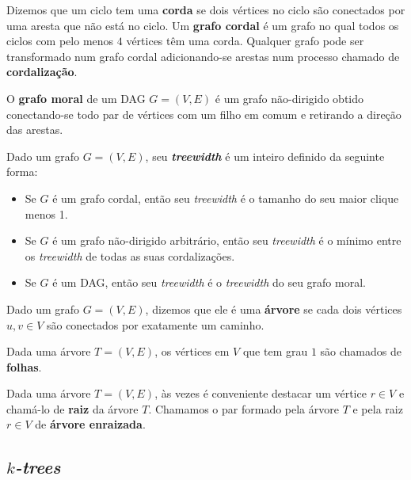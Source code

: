 Dizemos que um ciclo tem uma \textbf{corda} se dois vértices no ciclo são conectados por uma aresta que não está no ciclo. Um \textbf{grafo cordal} é um grafo no qual todos os ciclos com pelo menos $4$ vértices têm uma corda. Qualquer grafo pode ser transformado num grafo cordal adicionando-se arestas num processo chamado de \textbf{cordalização}.

O \textbf{grafo moral} de um DAG $G = (V, E)$ é um grafo não-dirigido obtido conectando-se todo par de vértices com um filho em comum e retirando a direção das arestas.

\begin{definition}[treewidth]
  \cite{maua} Dado um grafo $G = (V, E)$, seu \textbf{\emph{treewidth}} é um inteiro definido da seguinte forma:

  \begin{itemize}
    \item Se $G$ é um grafo cordal, então seu \emph{treewidth} é o tamanho do seu maior clique menos 1.
    \item Se $G$ é um grafo não-dirigido arbitrário, então seu \emph{treewidth} é o mínimo entre os \emph{treewidth} de todas as suas cordalizações.
    \item Se $G$ é um DAG, então seu \emph{treewidth} é o \emph{treewidth} do seu grafo moral.
  \end{itemize}
\end{definition}

\begin{definition}[árvore]
  Dado um grafo $G = (V, E)$, dizemos que ele é uma \textbf{árvore} se cada dois vértices $u, v \in V$ são conectados por exatamente um caminho.
\end{definition}

Dada uma árvore $T = (V, E)$, os vértices em $V$ que tem grau $1$ são chamados de \textbf{folhas}.

Dada uma árvore $T = (V, E)$, às vezes é conveniente destacar um vértice $r \in V$ e chamá-lo de \textbf{raiz} da árvore $T$. Chamamos o par formado pela árvore $T$ e pela raiz $r \in V$ de \textbf{árvore enraizada}.

\subsection{\emph{$k$-trees}}

